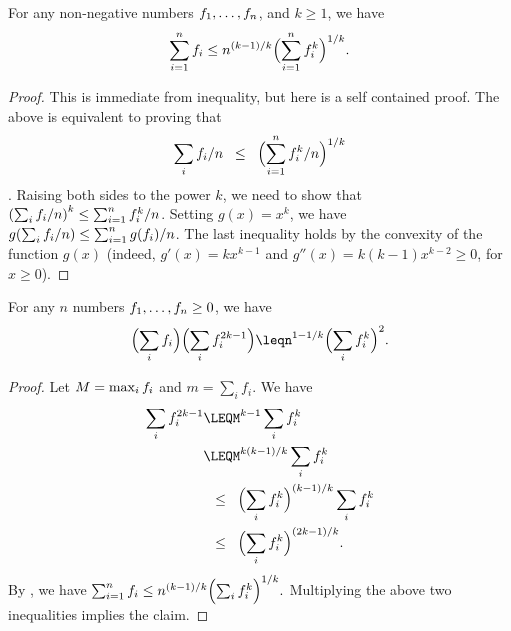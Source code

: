 \begin{lemma}
    For any non-negative numbers $f_1, \ldots, f_n$, and
    $k \geq 1 $, we have
    \begin{equation*}
        \sum_{i=1}^n f_i \leq n^{(k-1)/k} \Bigl( \sum_{i=1}^n
        f_i^k\Bigr)^{1/k}.
    \end{equation*}
\end{lemma}
\begin{proof}
    This is immediate from \Holder inequality, but here is a self
    contained proof.  The above is equivalent to proving that
    \begin{equation*}
        \sum_i \frq_i/n
        \LEQ%
        \Bigl( \sum_{i=1}^n \frq_i^k/n \Bigr)^{1/k}        
    \end{equation*}
.  Raising both sides to the power $k$, we need to show that
    $\pth{\sum_i \frq_i/n}^k \leq \sum_{i=1}^n \frq_i^k/n$. Setting
    $g(x)=x^k$, we have
    $g \pth{\sum_i \frq_i/n} \leq \sum_{i=1}^n g(\frq_i)/n$.  The last
    inequality holds by the convexity of the function $g(x)$ (indeed,
    $g'(x) = kx^{k-1}$ and $g''(x) = k(k-1)x^{k-2} \geq 0$, for
    $x \geq 0$).
\end{proof}


\begin{lemma}
    For any $n$ numbers $f_1, \ldots,f_n \geq 0$, we have
    \begin{equation*}
        \Bigl({\sum_i \frq_i} \Bigr) \Bigl( \sum_i \frq_i^{2k-1}
        \Bigr) %
        \leq%
        n^{1-1/k} \Bigl(\sum_i \frq_i^{k}\Bigr)^2.
    \end{equation*}
\end{lemma}
\begin{proof}
    Let 
    \begin{math}
        M =\max_i f_i
    \end{math}
    and $m = \sum_i f_i$. We have
    \begin{align*}
      \sum_i \frq_i^{2k-1}
      &\LEQ%
        M^{k-1}
        \sum_i \frq_i^{k}
        \\&
        \LEQ%
        M^{k(k-1)/k}
        \sum_i \frq_i^{k}
        \\&
        \LEQ%
        \Bigl(\sum_i \frq_i^k\Bigr)^{(k-1)/{k}}
        \sum_i \frq_i^{k}
        \\&%
        \LEQ%
        \Bigl(\sum_i \frq_i^k\Bigr)^{(2k-1)/{k}}.
    \end{align*}
    By , we have
    \begin{math}
        \sum_{i=1}^{n} \frq_i %
        \leq
        n^{(k-1)/k} \Bigl( \sum_i \frq_i^k\Bigr)^{1/k}.%
    \end{math}
    Multiplying the above two inequalities implies the claim.
\end{proof}

